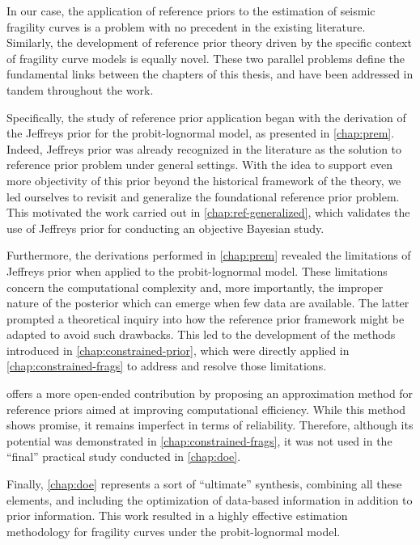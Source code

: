 In our case, the application of reference priors to the estimation of seismic fragility curves is a problem with no precedent in the existing literature. Similarly, the development of reference prior theory driven by the specific context of fragility curve models is equally novel. These two parallel problems define the fundamental links  between the chapters of this thesis, and have been addressed in tandem throughout the work.

Specifically, the study of reference prior application began with the derivation of the Jeffreys prior for the probit-lognormal model, as presented in \cref{chap:prem}. Indeed, Jeffreys prior was already recognized in the literature as the solution to reference prior problem under general settings. With the idea to support even more
 objectivity of this prior beyond the historical framework of the theory, we led ourselves to revisit and generalize the foundational reference prior problem. This motivated the work carried out in \cref{chap:ref-generalized}, which validates the use of Jeffreys prior for conducting an objective Bayesian study. %

Furthermore, the derivations performed in \cref{chap:prem} revealed the limitations of Jeffreys prior when applied to the probit-lognormal model. 
These limitations concern the computational complexity and, more importantly, the improper nature of the  posterior which can emerge when few data are available.
%
The latter prompted a theoretical inquiry into how the reference prior framework might be adapted to avoid such drawbacks. This led to the development of the methods introduced in \cref{chap:constrained-prior}, which were directly applied in \cref{chap:constrained-frags} to address and resolve those limitations.


 offers a more open-ended contribution by proposing an approximation method for reference priors aimed at improving computational efficiency. While this method shows promise, it remains imperfect in terms of reliability. Therefore, although its potential was demonstrated in \cref{chap:constrained-frags}, it was not used in the ``final'' practical study conducted in \cref{chap:doe}.


Finally, \cref{chap:doe} represents a sort of ``ultimate'' synthesis, combining all these elements, and including the optimization of data-based information in addition to prior information. This work resulted in a highly effective estimation methodology for fragility curves under the probit-lognormal model.




